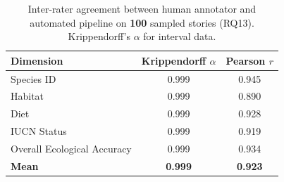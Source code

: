 \begin{table}[h]
\centering
\caption{Inter-rater agreement between human annotator and automated pipeline on \textbf{100} sampled stories (RQ13). Krippendorff's $\alpha$ for interval data.}
\label{tab:rq13}
\begin{tabular}{lcc}
\toprule
\textbf{Dimension} & \textbf{Krippendorff $\alpha$} & \textbf{Pearson $r$} \\
\midrule
Species ID & 0.999 & 0.945 \\
Habitat & 0.999 & 0.890 \\
Diet & 0.999 & 0.928 \\
IUCN Status & 0.999 & 0.919 \\
Overall Ecological Accuracy & 0.999 & 0.934 \\
\midrule
\textbf{Mean} & \textbf{0.999} & \textbf{0.923} \\
\bottomrule
\end{tabular}
\end{table}
